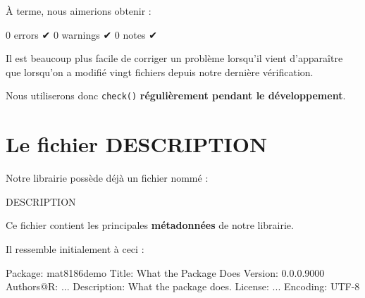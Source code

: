 \documentclass[
  letterpaper,
  DIV=11,
  numbers=noendperiod]{scrreprt}
\newenvironment{Shaded}{\begin{snugshade}}{\end{snugshade}}
\newcommand{\NormalTok}[1]{\textcolor[rgb]{0.00,0.23,0.31}{#1}}
\begin{document}
À terme, nous aimerions obtenir :

\begin{Shaded}
\begin{Highlighting}[]
\NormalTok{0 errors ✔}
\NormalTok{0 warnings ✔}
\NormalTok{0 notes ✔}
\end{Highlighting}
\end{Shaded}

\begin{tcolorbox}[enhanced jigsaw, arc=.35mm, title=\textcolor{quarto-callout-important-color}{\faExclamation}\hspace{0.5em}{Vérifier régulièrement}, colback=white, left=2mm, rightrule=.15mm, toptitle=1mm, opacityback=0, bottomtitle=1mm, breakable, colframe=quarto-callout-important-color-frame, coltitle=black, toprule=.15mm, titlerule=0mm, opacitybacktitle=0.6, bottomrule=.15mm, colbacktitle=quarto-callout-important-color!10!white, leftrule=.75mm]

Il est beaucoup plus facile de corriger un problème lorsqu'il vient
d'apparaître que lorsqu'on a modifié vingt fichiers depuis notre
dernière vérification.

Nous utiliserons donc \texttt{check()} \textbf{régulièrement pendant le
développement}.

\end{tcolorbox}

\section{Le fichier DESCRIPTION}\label{le-fichier-description}

Notre librairie possède déjà un fichier nommé :

\begin{Shaded}
\begin{Highlighting}[]
\NormalTok{DESCRIPTION}
\end{Highlighting}
\end{Shaded}

Ce fichier contient les principales \textbf{métadonnées} de notre
librairie.

Il ressemble initialement à ceci :

\begin{Shaded}
\begin{Highlighting}[]
\NormalTok{Package: mat8186demo}
\NormalTok{Title: What the Package Does}
\NormalTok{Version: 0.0.0.9000}
\NormalTok{Authors@R: ...}
\NormalTok{Description: What the package does.}
\NormalTok{License: ...}
\NormalTok{Encoding: UTF{-}8}
\end{Highlighting}
\end{Shaded}
\end{document}
